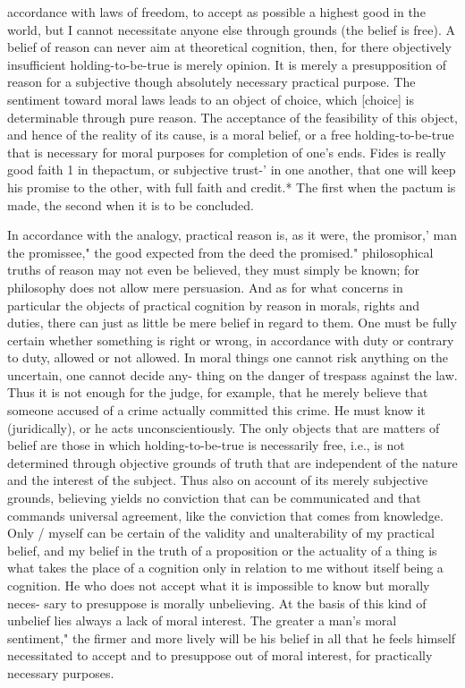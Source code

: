     accordance with laws of freedom, to accept as possible a highest good in the world, but I
    cannot necessitate anyone else through grounds (the belief is free).
    A belief of reason can never aim at theoretical cognition, then, for there objectively
    insufficient holding-to-be-true is merely opinion. It is merely a presupposition of reason for
    a subjective though absolutely necessary practical purpose. The sentiment toward moral
    laws leads to an object of choice, which [choice] is determinable through pure reason. The
    acceptance of the feasibility of this object, and hence of the reality of its cause, is a moral
    belief, or a free holding-to-be-true that is necessary for moral purposes for completion of
    one's ends.
    Fides is really good faith 1 in thepactum, or subjective trust-' in one another, that one will keep
    his promise to the other, with full faith and credit.* The first when the pactum is made, the
    second when it is to be concluded.

    In accordance with the analogy, practical reason is, as it were, the promisor,' man the
    promissee," the good expected from the deed the promised."
    philosophical truths of reason may not even be believed, they must simply
    be known; for philosophy does not allow mere persuasion. And as for
    what concerns in particular the objects of practical cognition by reason in
    morals, rights and duties, there can just as little be mere belief in regard to
    them. One must be fully certain whether something is right or wrong, in
    accordance with duty or contrary to duty, allowed or not allowed. In moral
    things one cannot risk anything on the uncertain, one cannot decide any-
    thing on the danger of trespass against the law. Thus it is not enough for the
    judge, for example, that he merely believe that someone accused of a crime
    actually committed this crime. He must know it (juridically), or he acts
    unconscientiously.
    The only objects that are matters of belief are those in which
    holding-to-be-true is necessarily free, i.e., is not determined through
    objective grounds of truth that are independent of the nature and the
    interest of the subject.
    Thus also on account of its merely subjective grounds, believing yields
    no conviction that can be communicated and that commands universal
    agreement, like the conviction that comes from knowledge. Only / myself
    can be certain of the validity and unalterability of my practical belief, and
    my belief in the truth of a proposition or the actuality of a thing is what
    takes the place of a cognition only in relation to me without itself being a
    cognition.
    He who does not accept what it is impossible to know but morally neces-
    sary to presuppose is morally unbelieving. At the basis of this kind of
    unbelief lies always a lack of moral interest. The greater a man's moral
    sentiment," the firmer and more lively will be his belief in all that he feels
    himself necessitated to accept and to presuppose out of moral interest, for
    practically necessary purposes.

